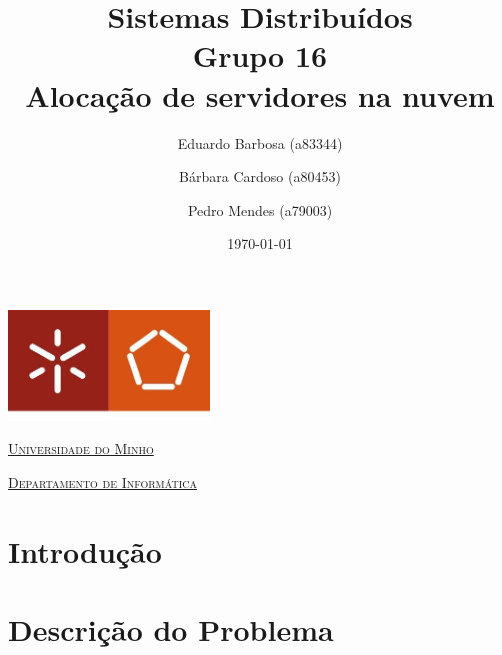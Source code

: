 \documentclass[a4paper]{article}
\begin{document}
\renewcommand\thesection{}
\renewcommand\thesubsection{}
\renewcommand\thesubsubsection{}

\title{Sistemas Distribuídos\\ Grupo 16 \\ Alocação de servidores na nuvem}
\author{Eduardo Barbosa (a83344) \and Bárbara Cardoso (a80453) \and Pedro Mendes (a79003)}
\date{\today}

\begin{titlepage}

    \thispagestyle{empty}
    \begin{center}
        \begin{minipage}{0.75\linewidth}
            \centering
            \includegraphics[width=0.4\textwidth]{eng.jpeg}\par\vspace{1cm}
            \vspace{1.5cm}
            \href{https://www.uminho.pt/PT}{\scshape\LARGE Universidade do Minho} \par
            \vspace{1cm}
            \href{https://www.di.uminho.pt/}{\scshape\Large Departamento de Informática} \par
            \vspace{1.5cm}

            \maketitle
        \end{minipage}
    \end{center}

\end{titlepage}

\tableofcontents

\pagebreak

\section{Introdução}

\pagebreak
\section{Descrição do Problema}
\end{document}
